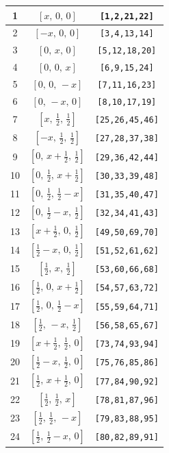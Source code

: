 \documentclass[fleqn,8pt]{jsarticle}
\begin{document}
\begin{longtable}{ccc}
1 & $\left[ x,\, 0,\, 0 \right]$ & {\tt [1,2,21,22]} \\ \hline
2 & $\left[ - x,\, 0,\, 0 \right]$ & {\tt [3,4,13,14]} \\ \hline
3 & $\left[ 0,\, x,\, 0 \right]$ & {\tt [5,12,18,20]} \\ \hline
4 & $\left[ 0,\, 0,\, x \right]$ & {\tt [6,9,15,24]} \\ \hline
5 & $\left[ 0,\, 0,\, - x \right]$ & {\tt [7,11,16,23]} \\ \hline
6 & $\left[ 0,\, - x,\, 0 \right]$ & {\tt [8,10,17,19]} \\ \hline
7 & $\left[ x,\, \frac{1}{2},\, \frac{1}{2} \right]$ & {\tt [25,26,45,46]} \\ \hline
8 & $\left[ - x,\, \frac{1}{2},\, \frac{1}{2} \right]$ & {\tt [27,28,37,38]} \\ \hline
9 & $\left[ 0,\, x + \frac{1}{2},\, \frac{1}{2} \right]$ & {\tt [29,36,42,44]} \\ \hline
10 & $\left[ 0,\, \frac{1}{2},\, x + \frac{1}{2} \right]$ & {\tt [30,33,39,48]} \\ \hline
11 & $\left[ 0,\, \frac{1}{2},\, \frac{1}{2} - x \right]$ & {\tt [31,35,40,47]} \\ \hline
12 & $\left[ 0,\, \frac{1}{2} - x,\, \frac{1}{2} \right]$ & {\tt [32,34,41,43]} \\ \hline
13 & $\left[ x + \frac{1}{2},\, 0,\, \frac{1}{2} \right]$ & {\tt [49,50,69,70]} \\ \hline
14 & $\left[ \frac{1}{2} - x,\, 0,\, \frac{1}{2} \right]$ & {\tt [51,52,61,62]} \\ \hline
15 & $\left[ \frac{1}{2},\, x,\, \frac{1}{2} \right]$ & {\tt [53,60,66,68]} \\ \hline
16 & $\left[ \frac{1}{2},\, 0,\, x + \frac{1}{2} \right]$ & {\tt [54,57,63,72]} \\ \hline
17 & $\left[ \frac{1}{2},\, 0,\, \frac{1}{2} - x \right]$ & {\tt [55,59,64,71]} \\ \hline
18 & $\left[ \frac{1}{2},\, - x,\, \frac{1}{2} \right]$ & {\tt [56,58,65,67]} \\ \hline
19 & $\left[ x + \frac{1}{2},\, \frac{1}{2},\, 0 \right]$ & {\tt [73,74,93,94]} \\ \hline
20 & $\left[ \frac{1}{2} - x,\, \frac{1}{2},\, 0 \right]$ & {\tt [75,76,85,86]} \\ \hline
21 & $\left[ \frac{1}{2},\, x + \frac{1}{2},\, 0 \right]$ & {\tt [77,84,90,92]} \\ \hline
22 & $\left[ \frac{1}{2},\, \frac{1}{2},\, x \right]$ & {\tt [78,81,87,96]} \\ \hline
23 & $\left[ \frac{1}{2},\, \frac{1}{2},\, - x \right]$ & {\tt [79,83,88,95]} \\ \hline
24 & $\left[ \frac{1}{2},\, \frac{1}{2} - x,\, 0 \right]$ & {\tt [80,82,89,91]} \\
\end{longtable}
\end{document}
